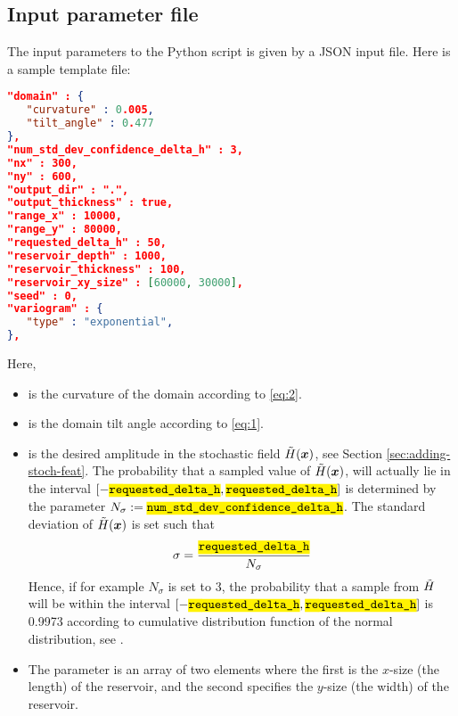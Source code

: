 \documentclass[11pt,a4paper]{amsart}
\begin{document}
\subsection{Input parameter file}
The input parameters to the Python script is given by a JSON input 
file. Here is a sample template file:
\begin{lstlisting}[language=json,firstnumber=1]
"domain" : {
   "curvature" : 0.005,
   "tilt_angle" : 0.477
},
"num_std_dev_confidence_delta_h" : 3,
"nx" : 300,
"ny" : 600,
"output_dir" : ".",
"output_thickness" : true,
"range_x" : 10000,
"range_y" : 80000,
"requested_delta_h" : 50,
"reservoir_depth" : 1000,
"reservoir_thickness" : 100,
"reservoir_xy_size" : [60000, 30000],
"seed" : 0,
"variogram" : {
   "type" : "exponential",
},
\end{lstlisting}
Here,
\begin{itemize}
\item {} is the curvature of the domain according
  to \eqref{eq:2}. 
\item {} is the domain tilt angle according
  to \eqref{eq:1}. 
\item {} is the desired amplitude
  in the stochastic field $\tilde{H}(\boldsymbol{x})$, see Section \ref{sec:adding-stoch-feat}.
The probability that a sampled value of $\tilde{H}(\boldsymbol{x})$,  will
actually lie in the interval 
  $[ - \jsonParam{requested\_delta\_h}, \jsonParam{requested\_delta\_h} ]$
  is determined by the parameter 
  $N_{\stdev} := \text{\jsonParam{num\_std\_dev\_confidence\_delta\_h}}$. 
  The standard deviation \stdev{} of $\tilde{H}(\boldsymbol{x})$ is set such that
  \begin{align}
    \label{eq:3}
    \stdev = \frac{\jsonParam{requested\_delta\_h}}{N_{\stdev}}
  \end{align}
  Hence, if for example
  $N_{\sigma}$ is set to 3, the probability that a sample from $\tilde{H}$
  will be within the 
  interval $[ - \jsonParam{requested\_delta\_h}, \jsonParam{requested\_delta\_h} ]$
  is 0.9973 according to
  cumulative distribution function of the normal distribution, see
  \cite{joh10:sta}.  

  \item  The parameter  is an array of two
    elements where the first is the $x$-size (the length) of the reservoir, and the
    second specifies the $y$-size (the width) of the reservoir.


\end{itemize}
\end{document}
